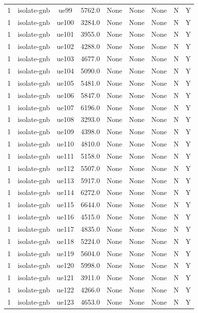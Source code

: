 \begin{table}[ht]
\begin{tabular}{|c|c|c|c|c|c|c|c|c|}
1 & isolate-gnb & ue99 & 5762.0 & None & None & None & N & Y \\
1 & isolate-gnb & ue100 & 3284.0 & None & None & None & N & Y \\
1 & isolate-gnb & ue101 & 3955.0 & None & None & None & N & Y \\
1 & isolate-gnb & ue102 & 4288.0 & None & None & None & N & Y \\
1 & isolate-gnb & ue103 & 4677.0 & None & None & None & N & Y \\
1 & isolate-gnb & ue104 & 5090.0 & None & None & None & N & Y \\
1 & isolate-gnb & ue105 & 5481.0 & None & None & None & N & Y \\
1 & isolate-gnb & ue106 & 5847.0 & None & None & None & N & Y \\
1 & isolate-gnb & ue107 & 6196.0 & None & None & None & N & Y \\
1 & isolate-gnb & ue108 & 3293.0 & None & None & None & N & Y \\
1 & isolate-gnb & ue109 & 4398.0 & None & None & None & N & Y \\
1 & isolate-gnb & ue110 & 4810.0 & None & None & None & N & Y \\
1 & isolate-gnb & ue111 & 5158.0 & None & None & None & N & Y \\
1 & isolate-gnb & ue112 & 5507.0 & None & None & None & N & Y \\
1 & isolate-gnb & ue113 & 5917.0 & None & None & None & N & Y \\
1 & isolate-gnb & ue114 & 6272.0 & None & None & None & N & Y \\
1 & isolate-gnb & ue115 & 6644.0 & None & None & None & N & Y \\
1 & isolate-gnb & ue116 & 4515.0 & None & None & None & N & Y \\
1 & isolate-gnb & ue117 & 4835.0 & None & None & None & N & Y \\
1 & isolate-gnb & ue118 & 5224.0 & None & None & None & N & Y \\
1 & isolate-gnb & ue119 & 5604.0 & None & None & None & N & Y \\
1 & isolate-gnb & ue120 & 5998.0 & None & None & None & N & Y \\
1 & isolate-gnb & ue121 & 3911.0 & None & None & None & N & Y \\
1 & isolate-gnb & ue122 & 4266.0 & None & None & None & N & Y \\
1 & isolate-gnb & ue123 & 4653.0 & None & None & None & N & Y \\

\end{tabular}
\end{table}
